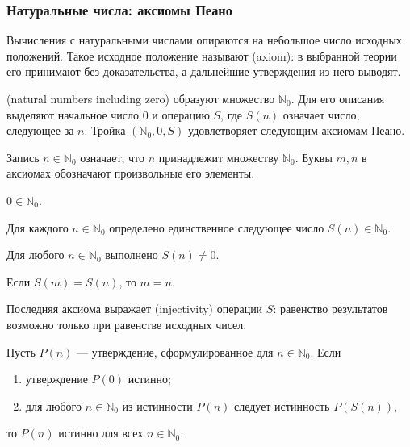 \subsubsection*{Натуральные числа: аксиомы Пеано}

Вычисления с натуральными числами опираются на небольшое число исходных положений.
Такое исходное положение называют  (axiom): в выбранной теории его принимают без доказательства,
а дальнейшие утверждения из него выводят.

\begin{definition}
 (natural numbers including zero) образуют множество \(\mathbb N_0\).
Для его описания выделяют начальное число \(0\) и операцию \(S\),
где \(S(n)\) означает число, следующее за \(n\).
Тройка \((\mathbb N_0,0,S)\) удовлетворяет следующим аксиомам Пеано.
\end{definition}

Запись \(n\in\mathbb N_0\) означает, что \(n\) принадлежит множеству \(\mathbb N_0\).
Буквы \(m,n\) в аксиомах обозначают произвольные его элементы.

\begin{axiom}
\(0\in\mathbb N_0\).
\end{axiom}

\begin{axiom}
Для каждого \(n\in\mathbb N_0\) определено единственное следующее число \(S(n)\in\mathbb N_0\).
\end{axiom}

\begin{axiom}
Для любого \(n\in\mathbb N_0\) выполнено \(S(n)\ne0\).
\end{axiom}

\begin{axiom}
Если \(S(m)=S(n)\), то \(m=n\).
\end{axiom}

Последняя аксиома выражает  (injectivity) операции \(S\):
равенство результатов возможно только при равенстве исходных чисел.

\begin{axiom}
Пусть \(P(n)\) --- утверждение, сформулированное для \(n\in\mathbb N_0\).
Если
\begin{enumerate}[label=\arabic*.,leftmargin=2em,itemsep=3pt]
\item утверждение \(P(0)\) истинно;
\item для любого \(n\in\mathbb N_0\) из истинности \(P(n)\) следует истинность \(P(S(n))\),
\end{enumerate}
то \(P(n)\) истинно для всех \(n\in\mathbb N_0\).
\end{axiom}

